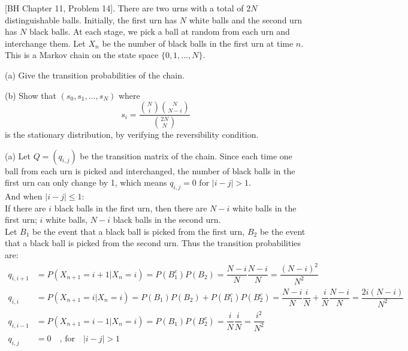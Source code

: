 \begin{homeworkProblem}

[BH Chapter 11, Problem 14]. There are two urns with a total of $2 N$ distinguishable balls. Initially, the first urn has $N$ white balls and the second urn has $N$ black balls. At each stage, we pick a ball at random from each urn and interchange them. Let $X_n$ be the number of black balls in the first urn at time $n$. This is a Markov chain on the state space $\{0,1, \ldots, N\}$.

(a) Give the transition probabilities of the chain.

(b) Show that $\left(s_0, s_1, \ldots, s_N\right)$ where
$$s_i=\dfrac{\binom{N}{i}\binom{N}{N-i}}{\binom{2N}{N}}$$
is the stationary distribution, by verifying the reversibility condition.

\solution

(a) Let $Q=(q_{i,j})$ be the transition matrix of the chain. Since each time one ball from each urn is picked and interchanged, the number of black balls in the first urn can only change by 1, which means $q_{i,j}=0$ for $|i-j|>1$. \\
And when $|i-j|\leq 1$: \\
If there are $i$ black balls in the first urn, then there are $N-i$ white balls in the first urn; $i$ white balls, $N-i$ black balls in the second urn. \\
Let $B_1$ be the event that a black ball is picked from the first urn, $B_2$ be the event that a black ball is picked from the second urn. Thus the transition probabilities are:
\begin{align*}
q_{i,i+1} &= P(X_{n+1}=i+1|X_n=i) = P(B_1^c)P(B_2) = \dfrac{N-i}{N}\dfrac{N-i}{N} = \dfrac{\left(N-i\right)^2}{N^2} \\
q_{i,i} &= P(X_{n+1}=i|X_n=i) = P(B_1)P(B_2) + P(B_1^c)P(B_2^c) = \dfrac{N-i}{N}\dfrac{i}{N} + \dfrac{i}{N}\dfrac{N-i}{N} = \dfrac{2i(N-i)}{N^2} \\
q_{i,i-1} &= P(X_{n+1}=i-1|X_n=i) = P(B_1)P(B_2^c) = \dfrac{i}{N}\dfrac{i}{N} = \dfrac{i^2}{N^2} \\
q_{i,j} &= 0 \quad \text{, for} \quad |i-j|>1
\end{align*}


\end{homeworkProblem}
